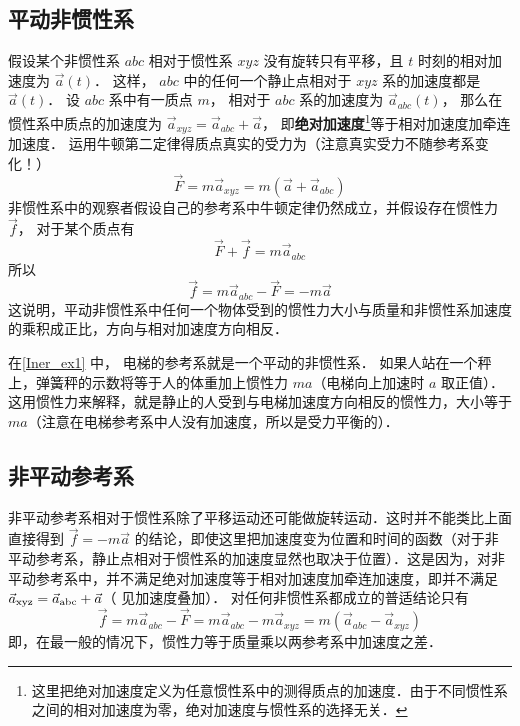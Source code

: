 \subsection{平动非惯性系}
假设某个非惯性系 $abc$ 相对于惯性系 $xyz$ 没有旋转只有平移，且 $t$ 时刻的相对加速度为 $\vec a\left( t \right)$． 这样， $abc$ 中的任何一个静止点相对于 $xyz$ 系的加速度都是 $\vec a\left( t \right)$． 设 $abc$ 系中有一质点 $m$， 相对于 $abc$ 系的加速度为 $\vec a_{abc}\left( t \right)$， 那么在惯性系中质点的加速度为 ${\vec a_{xyz}} = {\vec a_{abc}} + \vec a$， 即\textbf{绝对加速度}\footnote{这里把绝对加速度定义为任意惯性系中的测得质点的加速度．由于不同惯性系之间的相对加速度为零，绝对加速度与惯性系的选择无关．}等于相对加速度加牵连加速度． 运用牛顿第二定律得质点真实的受力为（注意真实受力不随参考系变化！）
\begin{equation}
\vec F = m {\vec a}_{xyz} = m(\vec a + {\vec a}_{abc} )
\end{equation}
非惯性系中的观察者假设自己的参考系中牛顿定律仍然成立，并假设存在惯性力 $\vec f$， 对于某个质点有
\begin{equation}
\vec F + \vec f = m \vec a_{abc}
\end{equation}
所以
\begin{equation}
\vec f = m{\vec a_{abc}} - \vec F =  - m\vec a
\end{equation}
这说明，平动非惯性系中任何一个物体受到的惯性力大小与质量和非惯性系加速度的乘积成正比，方向与相对加速度方向相反．

在\autoref{Iner_ex1} 中， 电梯的参考系就是一个平动的非惯性系． 如果人站在一个秤上，弹簧秤的示数将等于人的体重加上惯性力 $ma$（电梯向上加速时 $a$ 取正值）． 这用惯性力来解释，就是静止的人受到与电梯加速度方向相反的惯性力，大小等于 $ma$（注意在电梯参考系中人没有加速度，所以是受力平衡的）．

\subsection{非平动参考系}

非平动参考系相对于惯性系除了平移运动还可能做旋转运动．这时并不能类比上面直接得到 $\vec f =  - m\vec a$ 的结论，即使这里把加速度变为位置和时间的函数（对于非平动参考系，静止点相对于惯性系的加速度显然也取决于位置）．这是因为，对非平动参考系中，并不满足绝对加速度等于相对加速度加牵连加速度，即并不满足 ${\vec a_{{\rm{xyz}}}} = {\vec a_{{\rm{abc}}}} + \vec a$（ 见加速度叠加）． %
对任何非惯性系都成立的普适结论只有
\begin{equation}
\vec f = m{\vec a_{abc}} - \vec F = m{\vec a_{abc}} - m{\vec a_{xyz}} = m\left( {{{\vec a}_{abc}} - {{\vec a}_{xyz}}} \right)
\end{equation}
即，在最一般的情况下，惯性力等于质量乘以两参考系中加速度之差．

